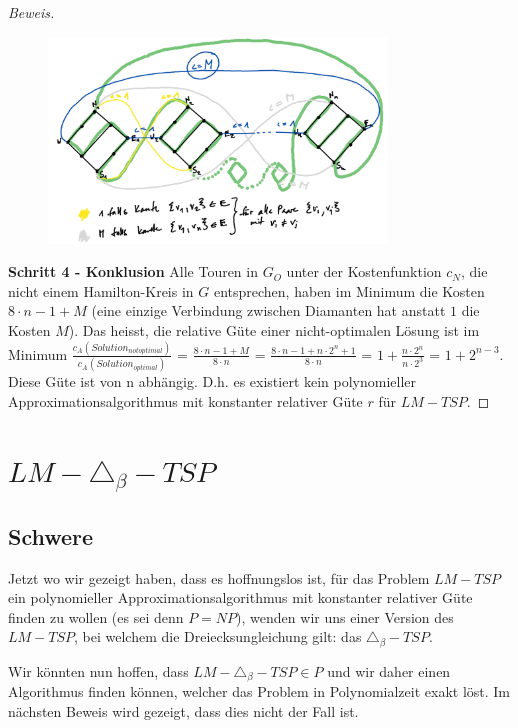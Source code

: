 \documentclass[a4paper,11pt]{scrreprt}
\begin{document}
\begin{proof}[Beweis]
\begin{figure}[H]
\centering
\includegraphics[width=0.8\textwidth]{lm_tsp_proof_step3.png}
\caption{}
\label{fig:lm-tsp-proof-step3}
\end{figure}

\textbf{Schritt 4 - Konklusion} Alle Touren in $G_O$ unter der Kostenfunktion $c_N$, die nicht einem Hamilton-Kreis in $G$ entsprechen, haben im Minimum die Kosten $8 \cdot n - 1 + M$ (eine einzige Verbindung zwischen Diamanten hat anstatt $1$ die Kosten $M$). Das heisst, die relative Güte einer nicht-optimalen Lösung ist im Minimum $\frac{c_A(Solution_{not optimal})}{c_A(Solution_{optimal})}$ = $\frac{8 \cdot n - 1 + M}{8 \cdot n}$ = $\frac{8 \cdot n - 1 + n \cdot 2^n + 1}{8 \cdot n}$ = $1 + \frac{n \cdot 2^n}{n \cdot 2^3}$ = $1 + 2^{n-3}$. Diese Güte ist von n abhängig. D.h. es existiert kein polynomieller Approximationsalgorithmus mit konstanter relativer Güte $r$ für $LM-TSP$.
\end{proof}

\section{$LM-\triangle_\beta-TSP$}

\subsection{Schwere}

Jetzt wo wir gezeigt haben, dass es hoffnungslos ist, für das Problem $LM-TSP$ ein polynomieller Approximationsalgorithmus mit konstanter relativer Güte finden zu wollen (es sei denn $P = NP$), wenden wir uns einer Version des $LM-TSP$, bei welchem die Dreiecksungleichung gilt: das $\triangle_\beta-TSP$. 

Wir könnten nun hoffen, dass $LM-\triangle_\beta-TSP \in P$ und wir daher einen Algorithmus finden können, welcher das Problem in Polynomialzeit exakt löst. Im nächsten Beweis wird gezeigt, dass dies nicht der Fall ist.
\end{document}
